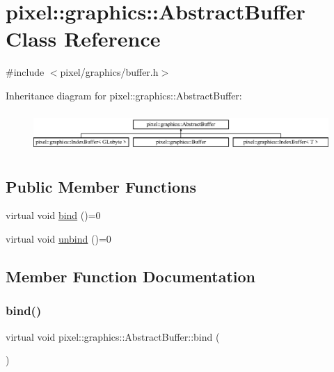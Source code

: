 \hypertarget{classpixel_1_1graphics_1_1_abstract_buffer}{}\section{pixel\+:\+:graphics\+:\+:Abstract\+Buffer Class Reference}
\label{classpixel_1_1graphics_1_1_abstract_buffer}


{\ttfamily \#include $<$pixel/graphics/buffer.\+h$>$}

Inheritance diagram for pixel\+:\+:graphics\+:\+:Abstract\+Buffer\+:\begin{figure}[H]
\begin{center}
\leavevmode
\includegraphics[height=1.536351cm]{classpixel_1_1graphics_1_1_abstract_buffer}
\end{center}
\end{figure}
\subsection*{Public Member Functions}
\begin{DoxyCompactItemize}
\item 
virtual void \hyperlink{classpixel_1_1graphics_1_1_abstract_buffer_a9d3bb463f35f08f5604012b7d22e113a}{bind} ()=0
\item 
virtual void \hyperlink{classpixel_1_1graphics_1_1_abstract_buffer_aee49569fa5c1767a40f2371ec96e40fc}{unbind} ()=0
\end{DoxyCompactItemize}


\subsection{Member Function Documentation}
\mbox{\label{classpixel_1_1graphics_1_1_abstract_buffer_a9d3bb463f35f08f5604012b7d22e113a}} 
\subsubsection{\texorpdfstring{bind()}{bind()}}
{\footnotesize\ttfamily virtual void pixel\+::graphics\+::\+Abstract\+Buffer\+::bind (\begin{DoxyParamCaption}{ }\end{DoxyParamCaption})\hspace{0.3cm}{\ttfamily [pure virtual]}}




